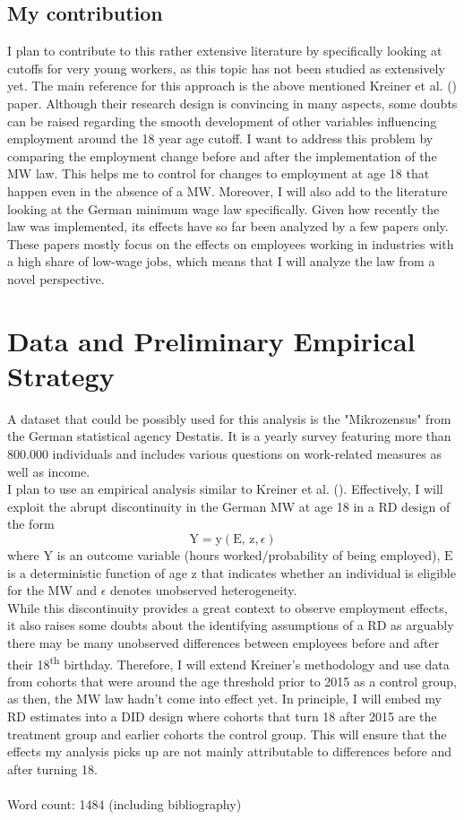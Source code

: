 \documentclass[11pt]{scrartcl}
\begin{document}
\subsection*{My contribution}
I plan to contribute to this rather extensive literature by specifically looking at cutoffs for very young workers, as this topic has not been studied as extensively yet. The main reference for this approach is the above mentioned Kreiner et al. (\citeyear{KreinerReckMW2020}) paper. Although their research design is convincing in many aspects, some doubts can be raised regarding the smooth development of other variables influencing employment around the 18 year age cutoff. I want to address this problem by comparing the employment change before and after the implementation of the MW law. This helps me to control for changes to employment at age 18 that happen even in the absence of a MW. Moreover, I will also add to the literature looking at the German minimum wage law specifically. Given how recently the law was implemented, its effects have so far been analyzed by a few papers only. These papers mostly focus on the effects on employees working in industries with a high share of low-wage jobs, which means that I will analyze the law from a novel perspective.

\section{Data and Preliminary Empirical Strategy}
A dataset that could be possibly used for this analysis is the "Mikrozensus" from the German statistical agency Destatis. It is a yearly survey featuring more than $800.000$ individuals and includes various questions on work-related measures as well as income. \\

I plan to use an empirical analysis similar to Kreiner et al. (\citeyear{KreinerReckMW2020}). Effectively, I will exploit the abrupt discontinuity in the German MW at age 18 in a RD design of the form
$$ \text{Y} = \text{y}(\text{E, z}, \epsilon) $$
where $\text{Y}$ is an outcome variable (hours worked/probability of being employed), $\text{E}$ is a deterministic function of age $\text{z}$ that indicates whether an individual is eligible for the MW and $ \epsilon $ denotes unobserved heterogeneity. \\
While this discontinuity provides a great context to observe employment effects, it also raises some doubts about the identifying assumptions of a RD as arguably there may be many unobserved differences between employees before and after their 18\textsuperscript{th} birthday. Therefore, I will extend Kreiner's methodology and use data from cohorts that were around the age threshold prior to 2015 as a control group, as then, the MW law hadn't come into effect yet. In principle, I will embed my RD estimates into a DID design where cohorts that turn 18 after 2015 are the treatment group and earlier cohorts the control group. This will ensure that the effects my analysis picks up are not mainly attributable to differences before and after turning 18. \\ \\ 

Word count: 1484 (including bibliography)



\printbibliography
\end{document}
